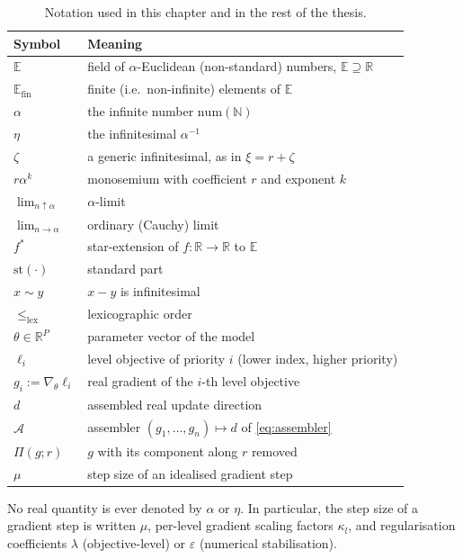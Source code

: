 \begin{table}[htbp]
  \centering
  \caption{Notation used in this chapter and in the rest of the thesis.}
  \label{tab:nsa-notation}
  \begin{tabular}{ll}
    \toprule
    \textbf{Symbol} & \textbf{Meaning} \\
    \midrule
    $\mathbb{E}$ & field of $\alpha$-Euclidean (non-standard) numbers, $\mathbb{E} \supseteq \mathbb{R}$ \\
    $\mathbb{E}_{\mathrm{fin}}$ & finite (i.e.\ non-infinite) elements of $\mathbb{E}$ \\
    $\alpha$ & the infinite number $\mathrm{num}(\mathbb{N})$ \\
    $\eta$ & the infinitesimal $\alpha^{-1}$ \\
    $\zeta$ & a generic infinitesimal, as in $\xi = r + \zeta$ \\
    $r\alpha^{k}$ & monosemium with coefficient $r$ and exponent $k$ \\
    $\lim_{n \uparrow \alpha}$ & $\alpha$-limit \\
    $\lim_{n \to \alpha}$ & ordinary (Cauchy) limit \\
    $f^{*}$ & star-extension of $f : \mathbb{R} \to \mathbb{R}$ to $\mathbb{E}$ \\
    $\mathrm{st}(\cdot)$ & standard part \\
    $x \sim y$ & $x - y$ is infinitesimal \\
    $\le_{\mathrm{lex}}$ & lexicographic order \\
    \midrule
    $\theta \in \mathbb{R}^{P}$ & parameter vector of the model \\
    $\ell_i$ & level objective of priority $i$ (lower index, higher priority) \\
    $g_i := \nabla_\theta \ell_i$ & real gradient of the $i$-th level objective \\
    $d$ & assembled real update direction \\
    $\mathcal{A}$ & assembler $(g_1,\dots,g_n) \mapsto d$ of \eqref{eq:assembler} \\
    $\Pi(g;r)$ & $g$ with its component along $r$ removed \\
    $\mu$ & step size of an idealised gradient step \\
    \bottomrule
  \end{tabular}
\end{table}

\begin{remark}
\label{rem:notation-scope}
No real quantity is ever denoted by $\alpha$ or $\eta$. In particular, the step size
of a gradient step is written $\mu$, per-level gradient scaling factors $\kappa_l$,
and regularisation coefficients $\lambda$ (objective-level) or $\varepsilon$
(numerical stabilisation).
\end{remark}
